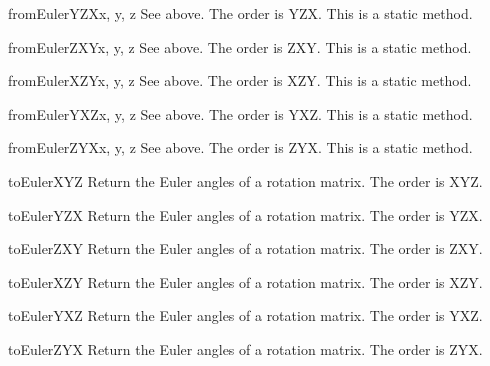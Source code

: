 \begin{methoddesc}{fromEulerYZX}{x, y, z}
See above. The order is YZX.
This is a static method.
\end{methoddesc}

\begin{methoddesc}{fromEulerZXY}{x, y, z}
See above. The order is ZXY.
This is a static method.
\end{methoddesc}

\begin{methoddesc}{fromEulerXZY}{x, y, z}
See above. The order is XZY.
This is a static method.
\end{methoddesc}

\begin{methoddesc}{fromEulerYXZ}{x, y, z}
See above. The order is YXZ.
This is a static method.
\end{methoddesc}

\begin{methoddesc}{fromEulerZYX}{x, y, z}
See above. The order is ZYX.
This is a static method.
\end{methoddesc}

\begin{methoddesc}{toEulerXYZ}{}
Return the Euler angles of a rotation matrix. The order is XYZ.
\end{methoddesc}

\begin{methoddesc}{toEulerYZX}{}
Return the Euler angles of a rotation matrix. The order is YZX.
\end{methoddesc}

\begin{methoddesc}{toEulerZXY}{}
Return the Euler angles of a rotation matrix. The order is ZXY.
\end{methoddesc}

\begin{methoddesc}{toEulerXZY}{}
Return the Euler angles of a rotation matrix. The order is XZY.
\end{methoddesc}

\begin{methoddesc}{toEulerYXZ}{}
Return the Euler angles of a rotation matrix. The order is YXZ.
\end{methoddesc}

\begin{methoddesc}{toEulerZYX}{}
Return the Euler angles of a rotation matrix. The order is ZYX.
\end{methoddesc}


